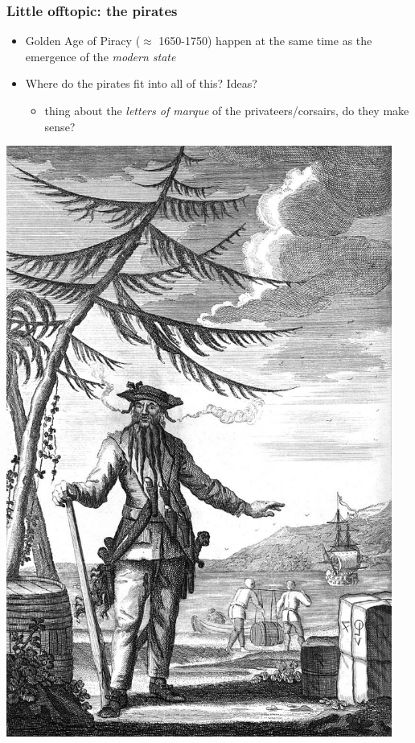 \documentclass[aspectratio=43, handout]{beamer}
\begin{document}
\begin{frame}
\frametitle{Little offtopic: the pirates}
\centering

\begin{minipage}{.6\textwidth}\centering
\begin{itemize}
  \item Golden Age of Piracy ($\approx$ 1650-1750) happen at the same time as the emergence of the \textit{modern state}
  \item Where do the pirates fit into all of this? Ideas?
  \begin{itemize}
    \item<2-> thing about the \textit{letters of marque} of the privateers/corsairs, do they make sense?
  \end{itemize}
\end{itemize}
\end{minipage}\hfill
\begin{minipage}{.4\textwidth}\centering
  \includegraphics[width = 0.95\textwidth]{img/blackbeard}
\end{minipage}
  
\end{frame}
\end{document}
